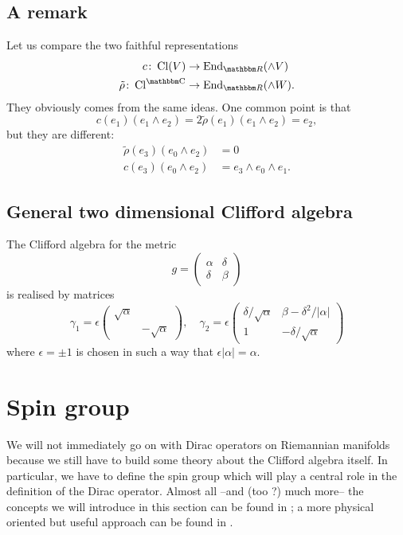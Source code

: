 \subsection{A remark}  %

 Let us compare the two faithful representations
\[ 
\begin{split}
  c\colon \Cliff(V)&\to \End_{\eR}(\wedge V)\\
\tilde\rho\colon \CCliff&\to  \End_{\eR}(\wedge W).
\end{split}  
\]
They obviously comes from the same ideas. One common point is that 
\[ 
  c(e_1)(e_1\wedge e_2)=2\tilde\rho (e_1)(e_1\wedge e_2)=e_2,
\]
but they are different:
\[ 
\begin{split}
  \tilde\rho(e_3)(e_0\wedge e_2)&=0\\
c(e_3)(e_0\wedge e_2)&=e_3\wedge e_0\wedge e_1.
\end{split}  
\]

\subsection{General two dimensional Clifford algebra}

The Clifford algebra for the metric
\[ 
  g=\begin{pmatrix}
\alpha&\delta\\\delta&\beta
\end{pmatrix}
\]
is realised by matrices
\[ 
  \gamma_1=
\epsilon\begin{pmatrix}
\sqrt{\alpha}\\ & -\sqrt{\alpha}
\end{pmatrix},\quad
\gamma_2=
\epsilon\begin{pmatrix}
\delta/\sqrt{\alpha}& \beta-\delta^2/| \alpha |\\
1		& -\delta/\sqrt{\alpha}	
\end{pmatrix}
\]
where $\epsilon=\pm 1$ is chosen in such a way that $\epsilon| \alpha |=\alpha$. 
 
\section{Spin group}

We will not immediately go on with Dirac operators on Riemannian manifolds because we still have to build some theory about the Clifford algebra itself. In particular, we have to define the spin group which will play a central role in the definition of the Dirac operator. Almost all --and (too ?) much more-- the concepts we will introduce in this section can be found in \cite{Chevalley}; a more physical oriented but useful approach can be found in \cite{Preparation}.

